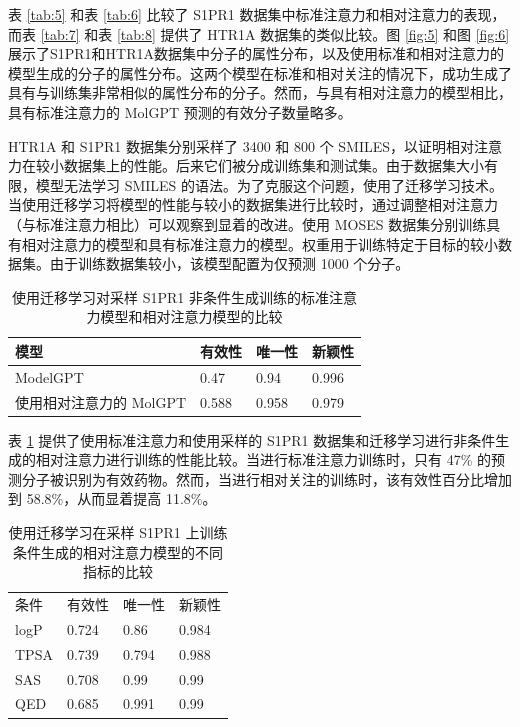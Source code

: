 \begin{translation}
表 \ref{tab:5} 和表 \ref{tab:6} 比较了 S1PR1 数据集中标准注意力和相对注意力的表现，而表 \ref{tab:7} 和表 \ref{tab:8} 提供了 HTR1A 数据集的类似比较。图 \ref{fig:5} 和图 \ref{fig:6} 展示了S1PR1和HTR1A数据集中分子的属性分布，以及使用标准和相对注意力的模型生成的分子的属性分布。这两个模型在标准和相对关注的情况下，成功生成了具有与训练集非常相似的属性分布的分子。然而，与具有相对注意力的模型相比，具有标准注意力的 MolGPT 预测的有效分子数量略多。

HTR1A 和 S1PR1 数据集分别采样了 3400 和 800 个 SMILES，以证明相对注意力在较小数据集上的性能。后来它们被分成训练集和测试集。由于数据集大小有限，模型无法学习 SMILES 的语法。为了克服这个问题，使用了迁移学习技术。当使用迁移学习将模型的性能与较小的数据集进行比较时，通过调整相对注意力（与标准注意力相比）可以观察到显着的改进。使用 MOSES 数据集分别训练具有相对注意力的模型和具有标准注意力的模型。权重用于训练特定于目标的较小数据集。由于训练数据集较小，该模型配置为仅预测 1000 个分子。

\begin{table}[H]
  \centering
  \caption{使用迁移学习对采样 S1PR1 非条件生成训练的标准注意力模型和相对注意力模型的比较}
  \label{tab:9}
  \begin{tabular}{llll}
    \hline 模型       & 有效性   & 唯一性   & 新颖性   \\
    \hline ModelGPT & 0.47  & 0.94  & 0.996 \\
    使用相对注意力的 MolGPT & 0.588 & 0.958 & 0.979 \\
    \hline
  \end{tabular}
\end{table}

表 \ref{tab:9} 提供了使用标准注意力和使用采样的 S1PR1 数据集和迁移学习进行非条件生成的相对注意力进行训练的性能比较。当进行标准注意力训练时，只有 47\% 的预测分子被识别为有效药物。然而，当进行相对关注的训练时，该有效性百分比增加到 58.8\%，从而显着提高 11.8\%。

\begin{table}[H]
  \centering
  \caption{使用迁移学习在采样 S1PR1 上训练条件生成的相对注意力模型的不同指标的比较}
  \label{tab:10}
  \begin{tabular}{llll}
    \hline 条件 & 有效性   & 唯一性   & 新颖性   \\
    logP      & 0.724 & 0.86  & 0.984 \\
    TPSA      & 0.739 & 0.794 & 0.988 \\
    SAS       & 0.708 & 0.99  & 0.99  \\
    QED       & 0.685 & 0.991 & 0.99  \\
    \hline
  \end{tabular}
\end{table}



\end{translation}
